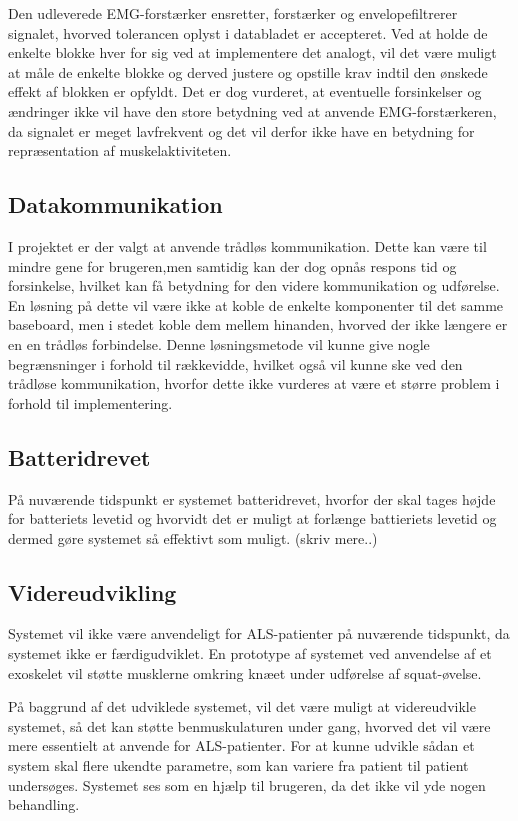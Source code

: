 Den udleverede EMG-forstærker ensretter, forstærker og envelopefiltrerer signalet, hvorved tolerancen oplyst i databladet er accepteret. Ved at holde de enkelte blokke hver for sig ved at implementere det analogt, vil det være muligt at måle de enkelte blokke og derved justere og opstille krav indtil den ønskede effekt af blokken er opfyldt. Det er dog vurderet, at eventuelle forsinkelser og ændringer ikke vil have den store betydning ved at anvende EMG-forstærkeren, da signalet er meget lavfrekvent og det vil derfor ikke have en betydning for repræsentation af muskelaktiviteten. 

\subsection{Datakommunikation}
I projektet er der valgt at anvende trådløs kommunikation. Dette kan være til mindre gene for brugeren,men samtidig kan der dog opnås respons tid og forsinkelse, hvilket kan få betydning for den videre kommunikation og udførelse. En løsning på dette vil være ikke at koble de enkelte komponenter til det samme baseboard, men i stedet koble dem mellem hinanden, hvorved der ikke længere er en en trådløs forbindelse. Denne løsningsmetode vil kunne give nogle begrænsninger i forhold til rækkevidde, hvilket også vil kunne ske ved den trådløse kommunikation, hvorfor dette ikke vurderes at være et større problem i forhold til implementering. 


\subsection{Batteridrevet}
På nuværende tidspunkt er systemet batteridrevet, hvorfor der skal tages højde for batteriets levetid og hvorvidt det er muligt at forlænge battieriets levetid og dermed gøre systemet så effektivt som muligt. (skriv mere..)

\subsection{Videreudvikling}
Systemet vil ikke være anvendeligt for ALS-patienter på nuværende tidspunkt, da systemet ikke er færdigudviklet. En prototype af systemet ved anvendelse af et exoskelet vil støtte musklerne omkring knæet under udførelse af squat-øvelse. 

På baggrund af det udviklede systemet, vil det være muligt at videreudvikle systemet, så det kan støtte benmuskulaturen under gang, hvorved det vil være mere essentielt at anvende for ALS-patienter. For at kunne udvikle sådan et system skal flere ukendte parametre, som kan variere fra patient til patient undersøges. Systemet ses som en hjælp til brugeren, da det ikke vil yde nogen behandling. 

